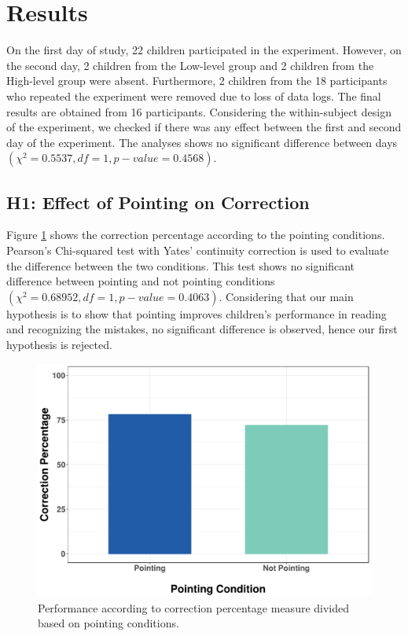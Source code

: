 \documentclass{sigchi}
\begin{document}
\section{Results}

On the first day of study, 22 children participated in the experiment.
However, on the second day, 2 children from the Low-level group and 2 children from the High-level group were absent.
Furthermore, 2 children from the 18 participants who repeated the experiment were removed due to loss of data logs.
The final results are obtained from 16 participants.
Considering the within-subject design of the experiment, we checked if there was any effect between the first and second day of the experiment.
The analyses shows no significant difference between days $(\chi^2 = 0.5537, df = 1, p-value = 0.4568)$.

\subsection{H1: Effect of Pointing on Correction}
Figure \ref{fig:Pointing} shows the correction percentage according to the pointing conditions.
Pearson's Chi-squared test with Yates' continuity correction is used to evaluate the difference between the two conditions.
This test shows no significant difference between pointing and not pointing conditions $(\chi^2 = 0.68952, df = 1, p-value = 0.4063)$.
Considering that our main hypothesis is to show that pointing improves children's performance in reading and recognizing the mistakes, no significant difference is observed, hence our first hypothesis is rejected. 

\begin{figure}[t]
  \centering
  \includegraphics[width=1\linewidth]{figures/cVp.pdf}
  \caption{Performance according to correction percentage measure divided based on pointing conditions.}
  \label{fig:Pointing}
\end{figure}
\end{document}
